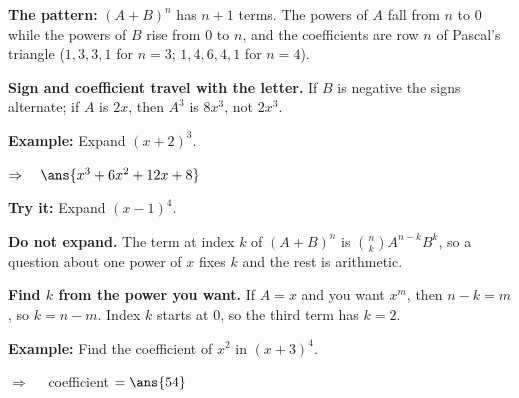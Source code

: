 \documentclass[12pt]{article}
\begin{document}


\begin{formulabox}
\textbf{The pattern:} $(A + B)^n$ has $n + 1$ terms. The powers of $A$ fall from $n$ to $0$
while the powers of $B$ rise from $0$ to $n$, and the coefficients are row $n$ of Pascal's
triangle ($1, 3, 3, 1$ for $n = 3$; $1, 4, 6, 4, 1$ for $n = 4$).\par
\textbf{Sign and coefficient travel with the letter.} If $B$ is negative the signs alternate;
if $A$ is $2x$, then $A^3$ is $8x^3$, not $2x^3$.
\end{formulabox}

\begin{examplebox}
\textbf{Example:} \quad Expand $(x + 2)^3$.

$\Rightarrow\quad \ans{x^3 + 6x^2 + 12x + 8}$
\end{examplebox}

\begin{tryitbox}
\textbf{Try it:} \quad Expand $(x - 1)^4$.\\[2pt]
\end{tryitbox}


\begin{formulabox}
\textbf{Do not expand.} The term at index $k$ of $(A + B)^n$ is $\binom{n}{k}A^{n-k}B^{k}$,
so a question about one power of $x$ fixes $k$ and the rest is arithmetic.\par
\textbf{Find $k$ from the power you want.} If $A = x$ and you want $x^{m}$, then
$n - k = m$, so $k = n - m$. Index $k$ starts at $0$, so the third term has $k = 2$.
\end{formulabox}

\begin{examplebox}
\textbf{Example:} \quad Find the coefficient of $x^2$ in $(x + 3)^4$.

$\Rightarrow\quad$ coefficient $= \ans{54}$
\end{examplebox}
\end{document}
